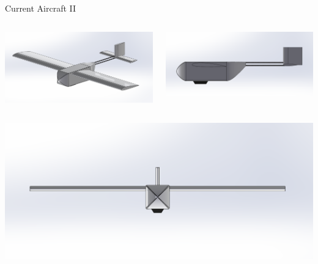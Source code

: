 \documentclass{beamer}
\begin{document}
    \begin{frame}{Current Aircraft II}
        \begin{columns}[T]
            \begin{column}{0.5\textwidth}
                \centering
                \includegraphics[width=\textwidth]{figures/current/Current Iso.png}
            \end{column}
    
            \begin{column}{0.5\textwidth}
                \centering
                \includegraphics[width=\textwidth]{figures/current/Current Side.png}
            \end{column}
        \end{columns}
    
        \vspace{1em}
    
        \begin{columns}[T]
            \begin{column}{0.5\textwidth}
                \centering
                \includegraphics[width=\textwidth]{figures/current/Current Front.png}
            \end{column}
    

\end{columns}
\end{frame}
\end{document}
